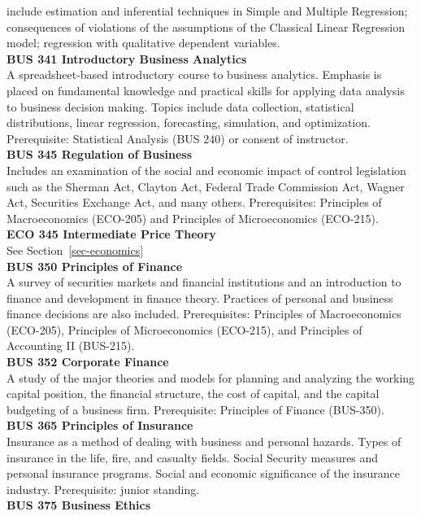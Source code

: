\documentclass[
  letterpaper,
]{scrbook}
\begin{document}
include estimation and inferential techniques in Simple and Multiple
Regression; consequences of violations of the assumptions of the
Classical Linear Regression model; regression with qualitative dependent
variables.\\
\textbf{BUS 341 Introductory Business Analytics}\\
A spreadsheet-based introductory course to business analytics. Emphasis
is placed on fundamental knowledge and practical skills for applying
data analysis to business decision making. Topics include data
collection, statistical distributions, linear regression, forecasting,
simulation, and optimization. Prerequisite: Statistical Analysis (BUS
240) or consent of instructor.\\
\textbf{BUS 345 Regulation of Business}\\
Includes an examination of the social and economic impact of control
legislation such as the Sherman Act, Clayton Act, Federal Trade
Commission Act, Wagner Act, Securities Exchange Act, and many others.
Prerequisites: Principles of Macroeconomics (ECO-205) and Principles of
Microeconomics (ECO-215).\\
\textbf{ECO 345 Intermediate Price Theory}\\
See Section~\ref{sec-economics}\\
\textbf{BUS 350 Principles of Finance}\\
A survey of securities markets and financial institutions and an
introduction to finance and development in finance theory. Practices of
personal and business finance decisions are also included.
Prerequisites: Principles of Macroeconomics (ECO-205), Principles of
Microeconomics (ECO-215), and Principles of Accounting II (BUS-215).\\
\textbf{BUS 352 Corporate Finance}\\
A study of the major theories and models for planning and analyzing the
working capital position, the financial structure, the cost of capital,
and the capital budgeting of a business firm. Prerequisite: Principles
of Finance (BUS-350).\\
\textbf{BUS 365 Principles of Insurance}\\
Insurance as a method of dealing with business and personal hazards.
Types of insurance in the life, fire, and casualty fields. Social
Security measures and personal insurance programs. Social and economic
significance of the insurance industry. Prerequisite: junior standing.\\
\textbf{BUS 375 Business Ethics}\\
\end{document}
